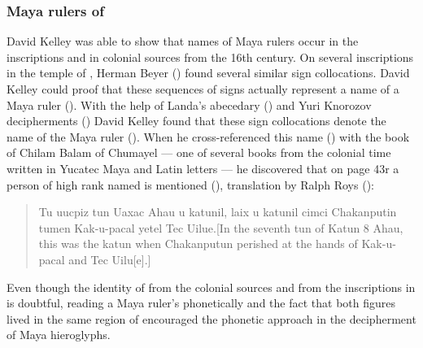 \documentclass[../main.tex]{subfiles}
\begin{document}
\subsubsection{Maya rulers of \chichenitza}
David Kelley was able to show that names of Maya rulers occur in the inscriptions and in colonial
sources from the 16th century.
On several inscriptions in the temple of \chichenitza, Herman Beyer (\cite{beyer1937}) 
found several similar sign collocations.
David Kelley could proof that these sequences of signs actually represent a
name of a Maya ruler (\cite{kelley1962a}). 
With the help of Landa's abecedary () and 
Yuri Knorozov decipherments (\cite{knorozov1967}) David Kelley found that these sign collocations 
denote the name of the Maya ruler \kakupakal 
(\cite[304-5]{kelley1962c}).
When he cross-referenced this name (\cite[\ppno~259--266]{kelley1968}) with the book of 
Chilam Balam of Chumayel 
--- one of several books from the colonial time written in Yucatec Maya and Latin letters ---
he discovered that on page 43r a person of high rank named  is mentioned 
(), 
translation by Ralph Roys (\cite[51,141]{roys1933}):
\begin{quote}
    Tu uucpiz tun Uaxac Ahau u katunil, laix u katunil cimci Chakanputin tumen 
    Kak-u-pacal yetel Tec Uilue.[In the seventh tun of Katun 8 Ahau, this was the katun when 
    Chakanputun perished at the hands of Kak-u-pacal and Tec Uilu[e].]
\end{quote}
Even though the identity of  from the colonial sources and \kakupakal from the 
inscriptions in \chichenitza is doubtful, reading a Maya ruler's phonetically and the fact that 
both figures lived in the same region of \chichenitza encouraged the phonetic approach 
in the decipherment of Maya hieroglyphs.
\end{document}
